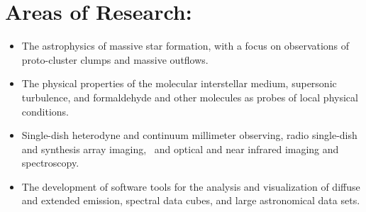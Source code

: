 \section*{Areas of Research: }
\begin{itemize}
    \item The astrophysics of massive star formation, with a focus on
        observations of proto-cluster clumps and massive outflows.
    \item The physical properties of the molecular interstellar medium,
        supersonic turbulence, and formaldehyde and other molecules as probes
        of local physical conditions. 
    \item Single-dish heterodyne and continuum millimeter observing, radio
        single-dish and synthesis array  imaging,  and optical and near
        infrared imaging and spectroscopy. 
    \item The development of software tools for the analysis and visualization
        of diffuse and extended emission, spectral data cubes, and large
        astronomical data sets.
\end{itemize}

